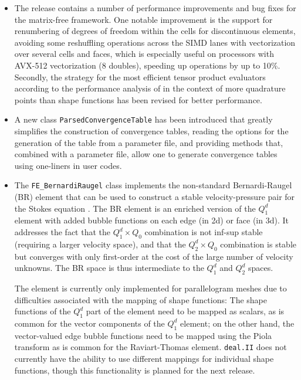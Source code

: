 \documentclass{ansarticle-preprint}
\newcommand{\specialword}[1]{\texttt{#1}}
\newcommand{\dealii}{{\specialword{deal.II}}\xspace}
\begin{document}
\begin{itemize}
\item
  The release contains a number of performance improvements and bug fixes for
  the matrix-free framework. One notable improvement is the support for
  renumbering of degrees of freedom within the cells for discontinuous
  elements, avoiding some reshuffling operations across the SIMD lanes
  with vectorization over several cells and faces, which is especially
  useful on processors with AVX-512 vectorization (8 doubles), speeding up
  operations by up to 10\%. Secondly, the strategy for the most efficient
  tensor product evaluators according to the performance analysis of
  \cite{KronbichlerKormann2019} in the context of more quadrature points than
  shape functions has been revised for better performance.

\item A new class \texttt{ParsedConvergenceTable} has been introduced
  that greatly simplifies the construction of convergence tables,
  reading the options for the generation of the table from a parameter
  file, and providing methods that, combined with a parameter file,
  allow one to generate convergence tables using one-liners in user
  codes.

\item
  The \texttt{FE\_BernardiRaugel} class implements the non-standard
  Bernardi-Raugel (BR) element that can be used to construct a stable
  velocity-pressure pair for the Stokes equation \cite{BR85}. The BR
  element is an enriched version of the $Q_1^d$ element with added bubble
  functions on each edge (in 2d) or face (in 3d). It addresses the fact
  that the $Q_1^d\times Q_0$ combination is not inf-sup stable (requiring a
  larger velocity space), and that the $Q_2^d\times Q_0$ combination is
  stable but converges with only first-order at the cost of the large
  number of velocity unknowns. The BR space is thus intermediate to the
  $Q_1^d$ and $Q_2^d$ spaces.

  The element is currently only implemented for parallelogram meshes due to
  difficulties associated with the mapping of shape functions: The shape
  functions of the $Q_1^d$ part of the element need to be mapped as
  scalars, as is common for the vector components of the $Q_1^d$ element;
  on the other hand, the vector-valued edge bubble functions need to be
  mapped using the Piola transform as is common for the Raviart-Thomas
  element. \dealii{} does not currently have the ability to use different
  mappings for individual shape functions, though this functionality is
  planned for the next release.


\end{itemize}
\end{document}
